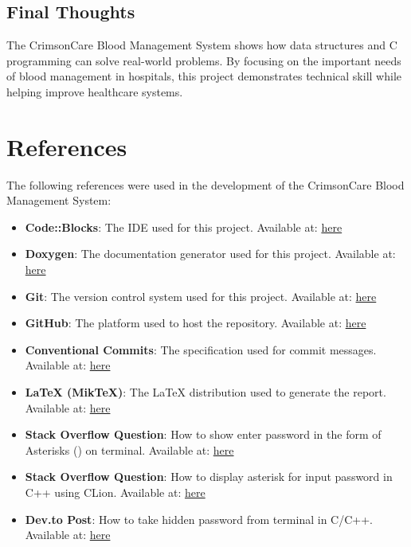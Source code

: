 \documentclass[12pt,a4paper]{report}
\begin{document}
\section{Final Thoughts}
The CrimsonCare Blood Management System shows how data structures and C programming can solve real-world problems.
By focusing on the important needs of blood management in hospitals, this project demonstrates technical skill while helping improve healthcare systems.

\chapter{References}

The following references were used in the development of the CrimsonCare Blood Management System:

\begin{itemize}
    \item \textbf{Code::Blocks}: The IDE used for this project. Available at: \href{http://www.codeblocks.org/}{here}
    \item \textbf{Doxygen}: The documentation generator used for this project. Available at: \href{https://www.doxygen.nl/}{here}
    \item \textbf{Git}: The version control system used for this project. Available at: \href{https://git-scm.com/}{here}
    \item \textbf{GitHub}: The platform used to host the repository. Available at: \href{https://github.com/}{here}
    \item \textbf{Conventional Commits}: The specification used for commit messages. Available at: \href{https://www.conventionalcommits.org/en/v1.0.0/}{here}
    \item \textbf{LaTeX (MikTeX)}: The LaTeX distribution used to generate the report. Available at: \href{https://miktex.org/}{here}
    \item \textbf{Stack Overflow Question}: How to show enter password in the form of Asterisks (\*) on terminal. Available at: \href{https://stackoverflow.com/questions/25990966/how-to-show-enter-password-in-the-form-of-asterisks-on-terminal}{here}
    \item \textbf{Stack Overflow Question}: How to display asterisk for input password in C++ using CLion. Available at: \href{https://stackoverflow.com/questions/41652182/how-to-display-asterisk-for-input-password-in-c-using-clion}{here}
    \item \textbf{Dev.to Post}: How to take hidden password from terminal in C/C++. Available at: \href{https://dev.to/namantam1/how-to-take-hidden-password-from-terminal-in-cc-3ddd}{here}

\end{itemize}
\end{document}
